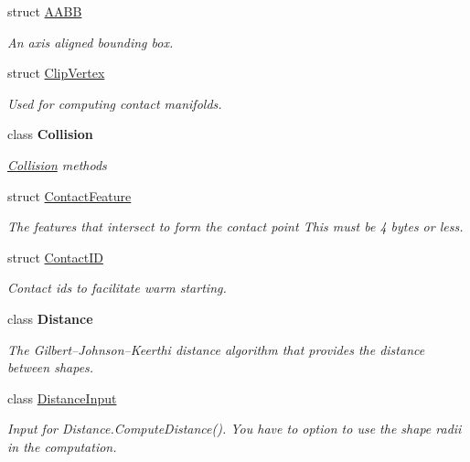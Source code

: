 \begin{DoxyCompactItemize}
\item 
struct \hyperlink{struct_farseer_physics_1_1_collision_1_1_a_a_b_b}{A\+A\+B\+B}
\begin{DoxyCompactList}\small\item\em An axis aligned bounding box. \end{DoxyCompactList}\item 
struct \hyperlink{struct_farseer_physics_1_1_collision_1_1_clip_vertex}{Clip\+Vertex}
\begin{DoxyCompactList}\small\item\em Used for computing contact manifolds. \end{DoxyCompactList}\item 
class {\bfseries Collision}
\begin{DoxyCompactList}\small\item\em \hyperlink{namespace_farseer_physics_1_1_collision}{Collision} methods \end{DoxyCompactList}\item 
struct \hyperlink{struct_farseer_physics_1_1_collision_1_1_contact_feature}{Contact\+Feature}
\begin{DoxyCompactList}\small\item\em The features that intersect to form the contact point This must be 4 bytes or less. \end{DoxyCompactList}\item 
struct \hyperlink{struct_farseer_physics_1_1_collision_1_1_contact_i_d}{Contact\+I\+D}
\begin{DoxyCompactList}\small\item\em Contact ids to facilitate warm starting. \end{DoxyCompactList}\item 
class {\bfseries Distance}
\begin{DoxyCompactList}\small\item\em The Gilbert–\+Johnson–\+Keerthi distance algorithm that provides the distance between shapes. \end{DoxyCompactList}\item 
class \hyperlink{class_farseer_physics_1_1_collision_1_1_distance_input}{Distance\+Input}
\begin{DoxyCompactList}\small\item\em Input for Distance.\+Compute\+Distance(). You have to option to use the shape radii in the computation. \end{DoxyCompactList}\item 

\end{DoxyCompactItemize}
